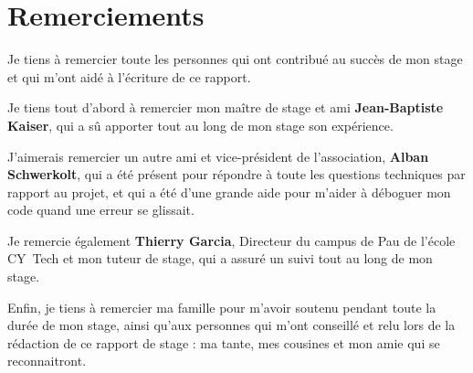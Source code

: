 \section*{Remerciements}

Je tiens à remercier toute les personnes qui ont contribué au succès de mon stage et qui m'ont aidé à l'écriture de ce rapport.

\medskip

Je tiens tout d'abord à remercier mon maître de stage et ami \textbf{Jean-Baptiste Kaiser}, qui a sû apporter tout au long de mon stage son expérience.

\medskip

J'aimerais remercier un autre ami et vice-président de l'association, \textbf{Alban Schwerkolt}, qui a été présent pour répondre à toute les questions techniques par rapport au projet, et qui a été d'une grande aide pour m'aider à déboguer mon code quand une erreur se glissait.

\medskip

Je remercie également \textbf{Thierry Garcia}, Directeur du campus de Pau de l'école CY~Tech et mon tuteur de stage, qui a assuré un suivi tout au long de mon stage.

\medskip

Enfin, je tiens à remercier ma famille pour m'avoir soutenu pendant toute la durée de mon stage, ainsi qu'aux personnes qui m'ont conseillé et relu lors de la rédaction de ce rapport de stage : ma tante, mes cousines et mon amie qui se reconnaitront.